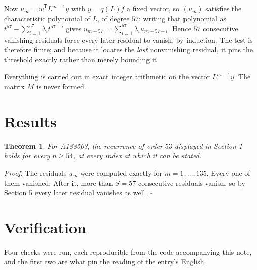\documentclass[11pt]{article}
\newtheorem{theorem}{Theorem}
\theoremstyle{definition}
\begin{document}
Now $u_m = \tilde w^{\mathsf T} L^{m-1} y$ with $y = q(L)\tilde f$ a fixed vector, so $(u_m)$ satisfies the characteristic polynomial of $L$, of degree $57$: writing that polynomial as $t^{57} - \sum_{i=1}^{57} \lambda_i t^{57-i}$ gives $u_{m+57} = \sum_{i=1}^{57} \lambda_i u_{m+57-i}$. Hence $57$ consecutive vanishing residuals force every later residual to vanish, by induction. The test is therefore finite; and because it locates the {\itshape last} nonvanishing residual, it pins the threshold exactly rather than merely bounding it.

Everything is carried out in exact integer arithmetic on the vector $L^{m-1}y$. The matrix $M$ is never formed.

\section{Results}

\begin{theorem} For A188503, the recurrence of order $53$ displayed in Section 1 holds for every $n \ge 54$, at every index at which it can be stated.\end{theorem}

{\itshape Proof.} The residuals $u_m$ were computed exactly for $m = 1,\dots,135$. Every one of them vanished. After it, more than $S = 57$ consecutive residuals vanish, so by Section 5 every later residual vanishes as well. $\square$

\section{Verification}

Four checks were run, each reproducible from the code accompanying this note, and the first two are what pin the reading of the entry's English.
\end{document}
